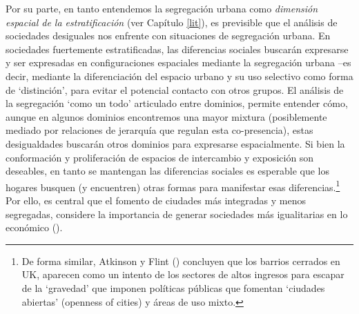 \documentclass[
  spanish,
  a4paper,%
  chapterprefix=true,%
  DIV=calc,%
  twoside]{scrbook}%
\begin{document}
Por su parte, en tanto entendemos la segregación urbana como \emph{dimensión
espacial de la estratificación} (ver Capítulo \ref{lit}), es previsible
que el análisis de sociedades desiguales nos enfrente con situaciones de
segregación urbana. En sociedades fuertemente estratificadas, las
diferencias sociales buscarán expresarse y ser expresadas en
configuraciones espaciales mediante la segregación urbana --es decir,
mediante la diferenciación del espacio urbano y su uso selectivo como
forma de `distinción', para evitar el potencial contacto con otros
grupos. El análisis de la segregación `como un todo' articulado entre
dominios, permite entender cómo, aunque en algunos dominios encontremos
una mayor mixtura (posiblemente mediado por relaciones de jerarquía que
regulan esta co-presencia), estas desigualdades buscarán otros dominios
para expresarse espacialmente. Si bien la conformación y proliferación
de espacios de intercambio y exposición son deseables, en tanto se
mantengan las diferencias sociales es esperable que los hogares busquen
(y encuentren) otras formas para manifestar esas
diferencias.\footnote{De forma similar, Atkinson y Flint ()
  concluyen que los barrios cerrados en UK, aparecen como un intento
  de los sectores de altos ingresos para escapar de la `gravedad' que
  imponen políticas públicas que fomentan `ciudades abiertas'
  (openness of cities) y áreas de uso mixto.} Por ello, es central que el fomento de
ciudades más integradas y menos segregadas, considere la importancia de
generar sociedades más igualitarias en lo económico ().
\end{document}
